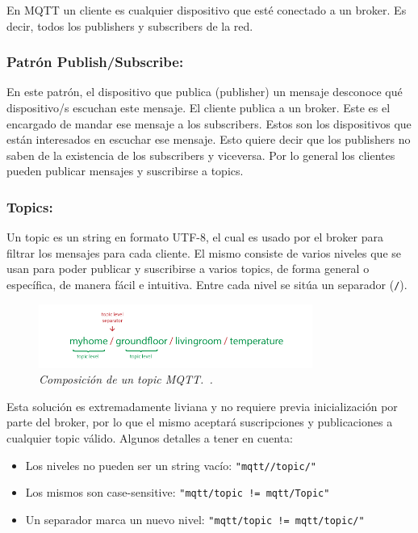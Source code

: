 En MQTT un cliente es cualquier dispositivo que esté conectado a un broker. Es decir, todos los publishers y subscribers de la red.

\subsubsection{Patrón Publish/Subscribe:}

En este patrón, el dispositivo que publica (publisher) un mensaje desconoce qué dispositivo/s escuchan este mensaje. El cliente publica a un broker. Este es el encargado de mandar ese mensaje a los subscribers. Estos son los  dispositivos que están interesados en escuchar ese mensaje. Esto quiere decir que los publishers no saben de la existencia de los subscribers y viceversa. Por lo general los clientes pueden publicar mensajes y suscribirse a topics. 

\subsubsection{Topics:}
Un topic es un string en formato UTF-8, el cual es usado por el broker para filtrar los mensajes para cada cliente. El mismo consiste de varios niveles que se usan para poder publicar y suscribirse a varios topics, de forma general o específica, de manera fácil e intuitiva. Entre cada nivel se sitúa un separador (\lstinline[columns=fixed]{/}). 

\begin{figure}[h!]
  \centering
  \includegraphics[width=0.8\textwidth, keepaspectratio]{images/topic-basics}
  \caption{\textit{Composición de un topic MQTT.~\cite{MQTTEssentials5}.}}
  \label{fig:topic-basics}
\end{figure}

Esta solución es extremadamente liviana y no requiere previa inicialización por parte del broker, por lo que el mismo aceptará suscripciones y publicaciones a cualquier topic válido.
Algunos detalles a tener en cuenta:

\begin{itemize}

\item Los niveles no pueden ser un string vacío:
\lstinline[columns=fixed]{"mqtt//topic/"}
\item Los mismos son case-sensitive:
\lstinline[columns=fixed]{"mqtt/topic != mqtt/Topic"}
 
\item Un separador marca un nuevo nivel:
\lstinline[columns=fixed]{"mqtt/topic != mqtt/topic/"}

\end{itemize}


